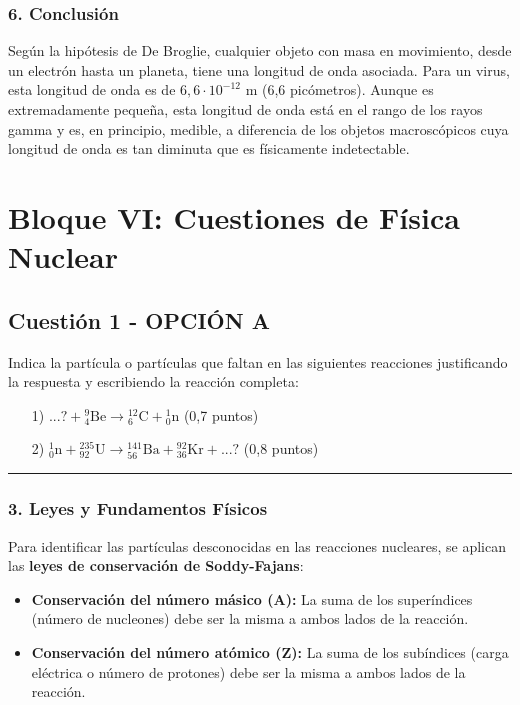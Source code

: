\subsubsection*{6. Conclusión}
\begin{cajaconclusion}
Según la hipótesis de De Broglie, cualquier objeto con masa en movimiento, desde un electrón hasta un planeta, tiene una longitud de onda asociada. Para un virus, esta longitud de onda es de $6,6 \cdot 10^{-12}$ m (6,6 picómetros). Aunque es extremadamente pequeña, esta longitud de onda está en el rango de los rayos gamma y es, en principio, medible, a diferencia de los objetos macroscópicos cuya longitud de onda es tan diminuta que es físicamente indetectable.
\end{cajaconclusion}

\newpage

\section{Bloque VI: Cuestiones de Física Nuclear}
\label{sec:nuclear_2008_jun_ord}

\subsection{Cuestión 1 - OPCIÓN A}
\label{subsec:6A_2008_jun_ord}
\begin{cajaenunciado}
Indica la partícula o partículas que faltan en las siguientes reacciones justificando la respuesta y escribiendo la reacción completa:
\begin{enumerate}
    \item[1)] $...? + {}_{4}^{9}\text{Be} \to {}_{6}^{12}\text{C} + {}_{0}^{1}\text{n}$ (0,7 puntos)
    \item[2)] ${}_{0}^{1}\text{n} + {}_{92}^{235}\text{U} \to {}_{56}^{141}\text{Ba} + {}_{36}^{92}\text{Kr} + ...?$ (0,8 puntos)
\end{enumerate}
\end{cajaenunciado}
\hrule

\subsubsection*{3. Leyes y Fundamentos Físicos}
Para identificar las partículas desconocidas en las reacciones nucleares, se aplican las \textbf{leyes de conservación de Soddy-Fajans}:
\begin{itemize}
    \item \textbf{Conservación del número másico (A):} La suma de los superíndices (número de nucleones) debe ser la misma a ambos lados de la reacción.
    \item \textbf{Conservación del número atómico (Z):} La suma de los subíndices (carga eléctrica o número de protones) debe ser la misma a ambos lados de la reacción.
\end{itemize}

